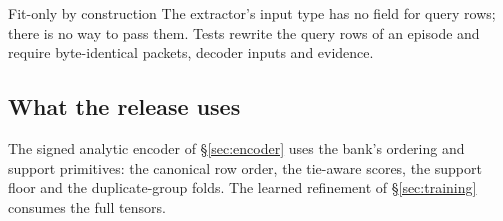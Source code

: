\documentclass[10pt,letterpaper,twocolumn]{article}
\begin{document}
\begin{callout}{Fit-only by construction}
The extractor's input type has no field for query rows; there is no way to pass them. Tests rewrite the query rows of an episode and require byte-identical packets, decoder inputs and evidence.
\end{callout}

\subsection{What the release uses}
The signed analytic encoder of \S\ref{sec:encoder} uses the bank's ordering and support primitives: the canonical row order, the tie-aware scores, the support floor and the duplicate-group folds. The learned refinement of \S\ref{sec:training} consumes the full tensors.
\end{document}
